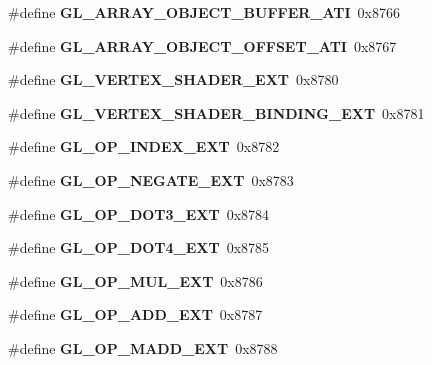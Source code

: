 \begin{DoxyCompactItemize}
\item 
\#define {\bfseries G\+L\+\_\+\+A\+R\+R\+A\+Y\+\_\+\+O\+B\+J\+E\+C\+T\+\_\+\+B\+U\+F\+F\+E\+R\+\_\+\+A\+T\+I}~0x8766\label{_s_d_l__opengl_8h_adacb3c6c1a78e2ad0abbcf8a16c5309a}

\item 
\#define {\bfseries G\+L\+\_\+\+A\+R\+R\+A\+Y\+\_\+\+O\+B\+J\+E\+C\+T\+\_\+\+O\+F\+F\+S\+E\+T\+\_\+\+A\+T\+I}~0x8767\label{_s_d_l__opengl_8h_a329a0d52b40358ca2bc25fb6cbe883d6}

\item 
\#define {\bfseries G\+L\+\_\+\+V\+E\+R\+T\+E\+X\+\_\+\+S\+H\+A\+D\+E\+R\+\_\+\+E\+X\+T}~0x8780\label{_s_d_l__opengl_8h_aa5a0abc881f5bd62b555b8535a09caa0}

\item 
\#define {\bfseries G\+L\+\_\+\+V\+E\+R\+T\+E\+X\+\_\+\+S\+H\+A\+D\+E\+R\+\_\+\+B\+I\+N\+D\+I\+N\+G\+\_\+\+E\+X\+T}~0x8781\label{_s_d_l__opengl_8h_ad637a1137c62a92de45cde3c5a8f2423}

\item 
\#define {\bfseries G\+L\+\_\+\+O\+P\+\_\+\+I\+N\+D\+E\+X\+\_\+\+E\+X\+T}~0x8782\label{_s_d_l__opengl_8h_a1e66a8915d33794ca994175afc83cb27}

\item 
\#define {\bfseries G\+L\+\_\+\+O\+P\+\_\+\+N\+E\+G\+A\+T\+E\+\_\+\+E\+X\+T}~0x8783\label{_s_d_l__opengl_8h_a5aab8486855dd3b5460e0e9829502a9e}

\item 
\#define {\bfseries G\+L\+\_\+\+O\+P\+\_\+\+D\+O\+T3\+\_\+\+E\+X\+T}~0x8784\label{_s_d_l__opengl_8h_a83b38360754c95dcc782aa41d72a7aa7}

\item 
\#define {\bfseries G\+L\+\_\+\+O\+P\+\_\+\+D\+O\+T4\+\_\+\+E\+X\+T}~0x8785\label{_s_d_l__opengl_8h_a31d1bb16f460be5f7da522c839de0ff9}

\item 
\#define {\bfseries G\+L\+\_\+\+O\+P\+\_\+\+M\+U\+L\+\_\+\+E\+X\+T}~0x8786\label{_s_d_l__opengl_8h_a04b603369054c8349f4644ab7e642e9b}

\item 
\#define {\bfseries G\+L\+\_\+\+O\+P\+\_\+\+A\+D\+D\+\_\+\+E\+X\+T}~0x8787\label{_s_d_l__opengl_8h_a340d7384e252b6a5b22bf56ddee49855}

\item 
\#define {\bfseries G\+L\+\_\+\+O\+P\+\_\+\+M\+A\+D\+D\+\_\+\+E\+X\+T}~0x8788\label{_s_d_l__opengl_8h_a941c222ea42a2b8120d352609b506901}


\end{DoxyCompactItemize}
